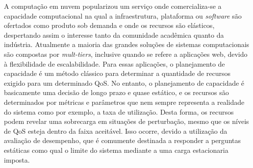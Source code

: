 

A computação em nuvem popularizou um serviço onde comercializa-se a capacidade computacional na qual a infraestrutura, plataforma ou \textit{software} são ofertados como produto sob demanda e onde os recursos são elásticos, despertando assim o interesse tanto da comunidade acadêmica quanto da indústria. Atualmente a maioria das grandes soluções de sistemas computacionais são compostas por \textit{mult-tiers}, inclusive quando se refere a aplicações web, devido à flexibilidade de escalabilidade. Para essas aplicações, o planejamento de capacidade é um método clássico para determinar a quantidade de recursos exigido para um determinado QoS. No entanto, o planejamento de capacidade é basicamente uma decisão de longo prazo e quase estático, e os recursos são determinados por métricas e parâmetros que nem sempre representa a realidade do sistema como por exemplo, a taxa de utilização. Desta forma, os recursos podem revelar uma sobrecarga em situações de perturbação, mesmo que os níveis de QoS esteja dentro da faixa aceitável. Isso ocorre, devido a utilização da avaliação de desempenho, que é comumente destinada a responder a perguntas estáticas como qual o limite do sistema mediante a uma carga estacionaria imposta. 

